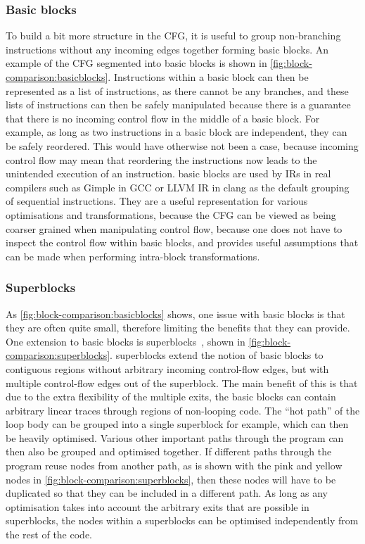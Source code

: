 \subsubsection{Basic blocks}

To build a bit more structure in the \gls{CFG}, it is useful to group
non-branching instructions without any incoming edges together forming
\glspl{basic block}.  An example of the \gls{CFG} segmented into \glspl{basic
  block} is shown in \cref{fig:block-comparison:basicblocks}.  Instructions
within a \gls{basic block} can then be represented as a list of instructions, as
there cannot be any branches, and these lists of instructions can then be safely
manipulated because there is a guarantee that there is no incoming control flow
in the middle of a \gls{basic block}.  For example, as long as two instructions
in a \gls{basic block} are independent, they can be safely reordered.  This
would have otherwise not been a case, because incoming control flow may mean
that reordering the instructions now leads to the unintended execution of an
instruction.  \Glspl{basic block} are used by \glspl{IR} in real compilers such
as Gimple in GCC or LLVM IR in clang as the default grouping of sequential
instructions.  They are a useful representation for various optimisations and
transformations, because the \gls{CFG} can be viewed as being coarser grained
when manipulating control flow, because one does not have to inspect the control
flow within basic blocks, and provides useful assumptions that can be made when
performing intra-block transformations.

\subsubsection{Superblocks}

As \cref{fig:block-comparison:basicblocks} shows, one issue with \glspl{basic
  block} is that they are often quite small, therefore limiting the benefits
that they can provide. One extension to \glspl{basic block} is
\glspl{superblock}~\cite[]{hwu93_super}, shown in
\cref{fig:block-comparison:superblocks}.  \Glspl{superblock} extend the notion
of \glspl{basic block} to contiguous regions without arbitrary incoming
control-flow edges, but with multiple control-flow edges out of the
\gls{superblock}.  The main benefit of this is that due to the extra flexibility
of the multiple exits, the \glspl{basic block} can contain arbitrary linear
traces through regions of non-looping code.  The \enquote{hot path} of the loop
body can be grouped into a single \gls{superblock} for example, which can then
be heavily optimised.  Various other important paths through the program can
then also be grouped and optimised together.  If different paths through the
program reuse nodes from another path, as is shown with the pink and yellow
nodes in \cref{fig:block-comparison:superblocks}, then these nodes will have to
be duplicated so that they can be included in a different path.  As long as any
optimisation takes into account the arbitrary exits that are possible in
\glspl{superblock}, the nodes within a \glspl{superblock} can be optimised
independently from the rest of the code.

